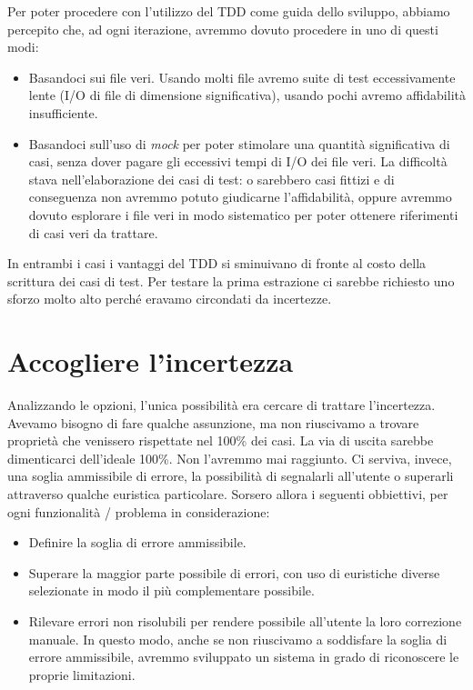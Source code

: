 \documentclass[12pt]{report}
\begin{document}
Per poter procedere con l'utilizzo del TDD come guida dello sviluppo,
abbiamo percepito che, ad ogni iterazione, avremmo dovuto
procedere in uno di questi modi:

\begin{itemize}
  \item Basandoci sui file veri. Usando molti file avremo suite di test
  eccessivamente lente (I/O di file di dimensione significativa),
  usando pochi avremo affidabilità insufficiente. 
  \item Basandoci sull'uso di \textit{mock} 
  per poter stimolare una quantità significativa di casi, 
  senza dover pagare gli eccessivi tempi di I/O dei file veri. 
  La difficoltà stava nell'elaborazione dei casi di test: o 
  sarebbero casi fittizi e di conseguenza non avremmo potuto giudicarne 
  l'affidabilità, oppure avremmo dovuto esplorare i file veri in modo
  sistematico per poter ottenere riferimenti di casi veri da trattare.
\end{itemize}

In entrambi i casi i vantaggi del TDD si sminuivano di fronte al costo della
scrittura dei casi di test. Per testare la prima estrazione
ci sarebbe richiesto uno sforzo molto alto perché eravamo
circondati da incertezze.

\section{Accogliere l'incertezza}

Analizzando le opzioni, l'unica possibilità era cercare di
trattare l'incertezza. Avevamo bisogno di fare qualche assunzione, ma
non riuscivamo a trovare proprietà che venissero rispettate nel 100\%
dei casi. La via di uscita sarebbe dimenticarci dell'ideale 100\%.
Non l'avremmo mai raggiunto. Ci serviva, invece, una soglia ammissibile di
errore, la possibilità di segnalarli all'utente o superarli attraverso qualche
euristica particolare. Sorsero allora i seguenti obbiettivi, per ogni
funzionalità / problema in considerazione: 

\begin{itemize}
  \item Definire la soglia di errore ammissibile.
  \item Superare la maggior parte possibile di errori, con uso di
euristiche diverse selezionate in modo il più complementare possibile.
  \item Rilevare errori non risolubili per rendere possibile
all'utente la loro correzione manuale. In questo modo, anche se non
riuscivamo a soddisfare la soglia di errore ammissibile, avremmo
sviluppato un sistema in grado di riconoscere le proprie limitazioni.
\end{itemize}
\end{document}
